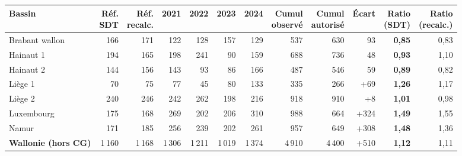 \begin{tabular}{lrrrrrrrrrrr}
\toprule
Bassin & \makecell{Réf.\\SDT} & \makecell{Réf.\\recalc.} & 2021 & 2022 & 2023 & 2024 & \makecell{Cumul\\observé} & \makecell{Cumul\\autorisé} & Écart & \makecell{Ratio\\(SDT)} & \makecell{Ratio\\(recalc.)} \\
\midrule
Brabant wallon & 166 & 171 & 122 & 128 & 157 & 129 & 537 & 630 & \textminus{}93 & \textbf{0{,}85} & 0{,}83 \\
Hainaut 1 & 194 & 165 & 198 & 241 & 90 & 159 & 688 & 736 & \textminus{}48 & \textbf{0{,}93} & 1{,}10 \\
Hainaut 2 & 144 & 156 & 143 & 93 & 86 & 166 & 487 & 546 & \textminus{}59 & \textbf{0{,}89} & 0{,}82 \\
Liège 1 & 70 & 75 & 77 & 45 & 80 & 133 & 335 & 266 & +69 & \textbf{1{,}26} & 1{,}17 \\
Liège 2 & 240 & 246 & 242 & 262 & 198 & 216 & 918 & 910 & +8 & \textbf{1{,}01} & 0{,}98 \\
Luxembourg & 175 & 168 & 269 & 202 & 206 & 310 & 988 & 664 & +324 & \textbf{1{,}49} & 1{,}55 \\
Namur & 171 & 185 & 256 & 239 & 202 & 261 & 957 & 649 & +308 & \textbf{1{,}48} & 1{,}36 \\
\midrule
\textbf{Wallonie (hors CG)} & 1\,160 & 1\,168 & 1\,306 & 1\,211 & 1\,019 & 1\,374 & 4\,910 & 4\,400 & +510 & \textbf{1{,}12} & 1{,}11 \\
\bottomrule
\end{tabular}
